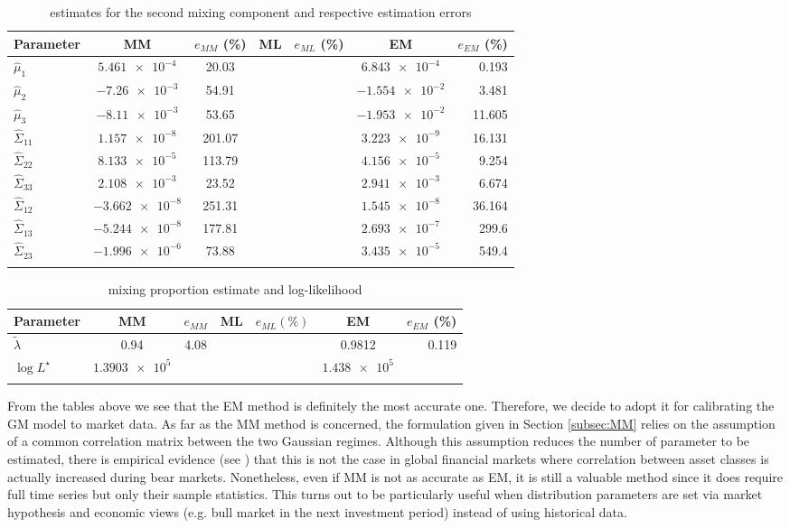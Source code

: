 \begin{longtable}{@{}lcccccr@{}} \toprule
	Parameter & MM & $e_{MM}$ (\%) & ML & $e_{ML}$ (\%) & EM & $e_{EM}$ (\%) \\ \midrule
	$\widehat{\mu}_{1}$  & $\num{5.461e-4}$  & 20.03 & & & $\num{6.843e-4}$ & 0.193 \\ \addlinespace[0.5em]
	$\widehat{\mu}_{2}$  & $\num{-7.26e-3}$     & 54.91 & & & $\num{-1.554e-2}$ & 3.481\\
	\addlinespace[0.5em]
	$\widehat{\mu}_{3}$  & $\num{-8.11e-3}$   & 53.65 & & & $\num{-1.953e-2}$ & 11.605 \\
	\addlinespace[0.5em]
	$\widehat{\Sigma}_{11}$ & $\num{1.157e-8}$ & 201.07 & & & $\num{3.223e-9}$ & 16.131  \\
	\addlinespace[0.5em]
	$\widehat{\Sigma}_{22}$ & $\num{8.133e-5}$ & 113.79  & & & $\num{4.156e-5}$ & 9.254    \\
	\addlinespace[0.5em]
	$\widehat{\Sigma}_{33}$ & $\num{2.108e-3}$ & 23.52   & & & $\num{2.941e-3}$ & 6.674   \\
	\addlinespace[0.5em]
	$\widehat{\Sigma}_{12}$ & $\num{-3.662e-8}$ & 251.31 & & & $\num{1.545e-8}$  & 36.164 \\
	\addlinespace[0.5em]
	$\widehat{\Sigma}_{13}$ & $\num{-5.244e-8}$ & 177.81 & & & $\num{2.693e-7}$ & 299.6  \\
	\addlinespace[0.5em]
	$\widehat{\Sigma}_{23}$ & $\num{-1.996e-6}$ & 73.88  & & & $\num{3.435e-5}$ & 549.4  \\\bottomrule
	\addlinespace[0.5em]
	\caption{estimates for the second mixing component and respective estimation errors}
\end{longtable}
\begin{table}
	\centering
	\begin{tabular}{@{}lcccccr@{}} \toprule
		Parameter & MM & $e_{MM}$ & ML & $e_{ML} (\%)$ & EM & $e_{EM}$ (\%)\\ \midrule
		$\widetilde{\lambda}$  & 0.94  & 4.08 & & & 0.9812 & 0.119 \\
		\addlinespace[0.5em]
		$\log L^{\star}$ & $\num{1.3903e+5}$ & & & & $\num{1.438e+5}$ & \\ \bottomrule
		\addlinespace[0.5em]
	\end{tabular}
	\caption{mixing proportion estimate and log-likelihood}
\end{table}
From the tables above we see that the EM method is definitely the most accurate one. Therefore, we decide to adopt it for calibrating the GM model to market data. As far as the MM method is concerned, the formulation given in Section \ref{subsec:MM} relies on the assumption of a common correlation matrix between the two Gaussian regimes. Although this assumption reduces the number of parameter to be estimated, there is empirical evidence (see \cite{Campbell2002}) that this is not the case in global financial markets where correlation between asset classes is actually increased during bear markets. Nonetheless, even if MM is not as accurate as EM, it is still a valuable method since it does require full time series but only their sample statistics. This turns out to be particularly useful when distribution parameters are set via market hypothesis and economic views (e.g. bull market in the next investment period) instead of using historical data.

